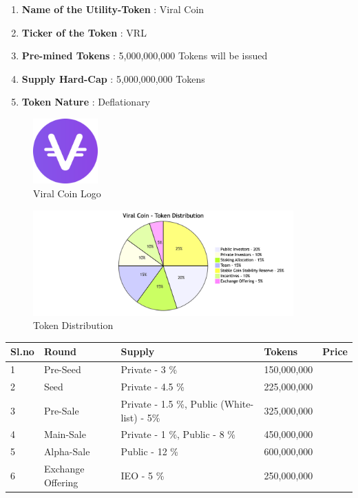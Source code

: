 \documentclass[conference]{IEEEtran}
\begin{document}
\begin{enumerate}[wide, labelwidth=!, labelindent=0pt]
\item \textbf{Name of the Utility-Token} : Viral Coin
\item \textbf{Ticker of the Token} : VRL
\item \textbf{Pre-mined Tokens} : 5,000,000,000 Tokens will be issued 
\item \textbf{Supply Hard-Cap} : 5,000,000,000 Tokens
\item \textbf{Token Nature} : Deflationary
\end{enumerate}

\begin{figure}[H]
\begin{center}
\includegraphics[width=2.5cm]{viral-coin-logo}
\caption{Viral Coin Logo}
\end{center}
\end{figure}

\begin{figure}[H]
\begin{center}
\includegraphics[width=10cm]{token-distribution}
\caption{Token Distribution}
\end{center}
\end{figure}


\begin{center}
\begin{table}[!ht]
    \centering
    \begin{tabular}{|l|l|l|l|l|}
    \hline
        \textbf{Sl.no} & \textbf{Round} & \textbf{Supply} & \textbf{Tokens} & \textbf{Price} \\ \hline
        1 & Pre-Seed & Private - 3 \% & 150,000,000 & ~ \\ \hline
        2 & Seed & Private - 4.5 \% & 225,000,000 & ~ \\ \hline
        3 & Pre-Sale & Private - 1.5 \%,  Public (White-list) - 5\%  & 325,000,000 & ~ \\ \hline
        4 & Main-Sale & Private -  1 \%, Public - 8 \% & 450,000,000 & ~ \\ \hline
        5 & Alpha-Sale & Public - 12 \% & 600,000,000 & ~ \\ \hline
        6 & Exchange Offering & IEO - 5 \% & 250,000,000 & ~ \\ \hline
    \end{tabular}
\end{table}
\end{center}
\end{document}

